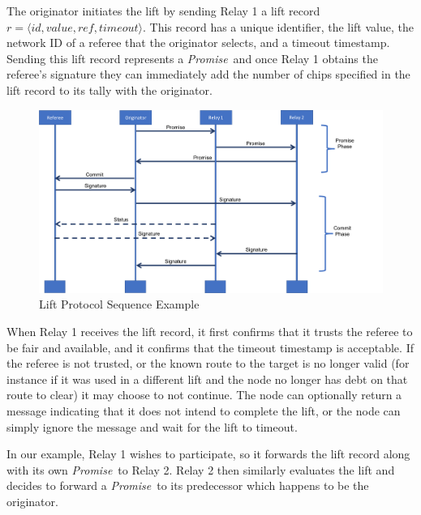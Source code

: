 \documentclass[runningheads]{llncs}
\newcommand{\promise}{\emph{Promise}}
\newcommand{\spin}{Spin}
\newif\ifcomments
\newif\ifkylecomments
\newcommand{\egm}[1]{\ifcomments\textcolor{orange}{egm: #1}\fi}
\newcommand{\krs}[1]{\ifkylecomments\textcolor{blue}{krs: #1}\fi}
\begin{document}
The originator initiates the lift by sending Relay 1 a lift record
\sloppy $r = \langle \mathit{id}, \mathit{value}, \mathit{ref}, \mathit{timeout}\rangle.$ This record has a unique identifier, the lift value, the network ID of a referee that the originator selects, and a timeout timestamp. Sending this lift record represents a \promise\ and once Relay 1 obtains the referee's signature they can immediately add the number of chips specified in the lift record to its tally with the originator.

\begin{figure}
    \centering
    \includegraphics[scale=0.35]{SequenceDiagramLifeline.png}
    \caption{Lift Protocol Sequence Example}
    \label{fig:liftSequence}
\end{figure}

When Relay 1 receives the lift record, it first confirms that it trusts the referee to be fair and available, and it confirms that the timeout timestamp is acceptable. If the referee is not trusted, or the known route to the target is no longer valid (for instance if it was used in a different lift and the node no longer has debt on that route to clear) it may choose to not continue. The node can optionally return a message indicating that it does not intend to complete the lift, or the node can simply ignore the message and wait for the lift to timeout. 
\krs{ Sounds good. This was just a one-off sentence and I removed it, note to self: find an appropriate place to put that. \egm{Move the following section to the section that describes the model checker model. Let's not mix the general protocol description with how we chose to model it in \spin.}}
\krs{
I'm pretty verbose here but folks that understand the protocol can just skip this, folks who don't get it might appreciate the detail}
In our example, Relay 1 wishes to participate, so it forwards the lift record along with its own \promise\ to Relay 2. Relay 2 then similarly evaluates the lift and decides to forward a \promise\ to its predecessor which happens to be the originator. 
\end{document}
